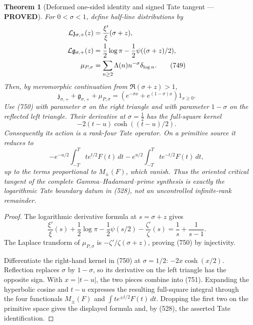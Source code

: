 \documentclass[11pt]{article}
\newtheorem{theorem}{Theorem}
\newcommand{\PROVED}{\textcolor{green!45!black}{\textbf{PROVED}}}
\begin{document}
\begin{theorem}[Deformed one-sided identity and signed Tate tangent ---
\PROVED]
For \(0<\sigma<1\), define half-line distributions by
\begin{align}
 \mathcal L\mathfrak z_{\sigma,+}(z)
 &=\frac{\xi'}{\xi}(\sigma+z),\notag\\
 \mathcal L\mathfrak g_{\sigma,+}(z)
 &=\frac12\log\pi-\frac12\psi((\sigma+z)/2),\notag\\
 \mu_{P,\sigma}
 &=\sum_{n\ge2}\Lambda(n)n^{-\sigma}\delta_{\log n}.
                                                               \tag{749}
\end{align}
Then, by meromorphic continuation from \(\Re(\sigma+z)>1\),
\begin{equation}
 \boxed{
 \mathfrak z_{\sigma,+}
 +\mathfrak g_{\sigma,+}
 +\mu_{P,\sigma}
 =
 \left(e^{-\sigma x}+e^{(1-\sigma)x}\right)1_{x\ge0}.} \tag{750}
\end{equation}
Use (750) with parameter \(\sigma\) on the right triangle and with
parameter \(1-\sigma\) on the reflected left triangle.  Their derivative
at \(\sigma=\frac12\) has the full-square kernel
\begin{equation}
 \boxed{
 -2(t-u)\cosh((t-u)/2).}                             \tag{751}
\end{equation}
Consequently its action is a rank-four Tate operator.  On a primitive
source it reduces to
\[
 -e^{-u/2}\int_{-T}^Tt e^{t/2}F(t)\,dt
 -e^{u/2}\int_{-T}^Tt e^{-t/2}F(t)\,dt,
\]
up to the terms proportional to \(M_\pm(F)\), which vanish.  Thus the
oriented critical tangent of the complete Gamma--Hadamard--prime synthesis
is exactly the logarithmic Tate boundary datum in (528), not an
uncontrolled infinite-rank remainder.
\end{theorem}

\begin{proof}
The logarithmic derivative formula at \(s=\sigma+z\) gives
\[
 \frac{\xi'}{\xi}(s)
 +\frac12\log\pi-\frac12\psi(s/2)
 -\frac{\zeta'}{\zeta}(s)
 =\frac1s+\frac1{s-1}.
\]
The Laplace transform of \(\mu_{P,\sigma}\) is
\(-\zeta'/\zeta(\sigma+z)\), proving (750) by injectivity.

Differentiate the right-hand kernel in (750) at \(\sigma=1/2\):
\(-2x\cosh(x/2)\).  Reflection replaces \(\sigma\) by \(1-\sigma\), so its
derivative on the left triangle has the opposite sign.  With
\(x=|t-u|\), the two pieces combine into (751).  Expanding the hyperbolic
cosine and \(t-u\) expresses the resulting full-square integral through
the four functionals
\(M_\pm(F)\) and
\(\int t e^{\pm t/2}F(t)\,dt\).  Dropping the first two on the primitive
space gives the displayed formula and, by (528), the asserted Tate
identification.
\end{proof}
\end{document}
